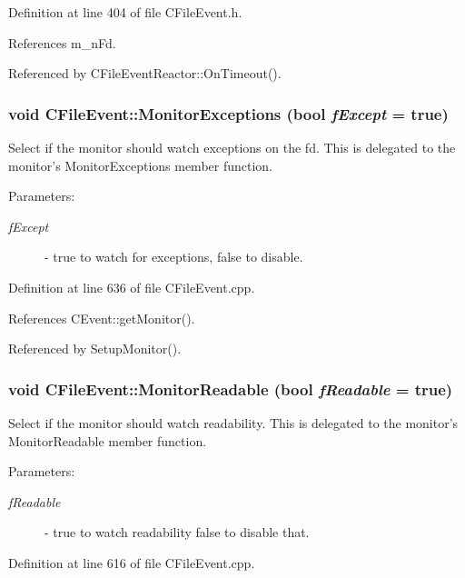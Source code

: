 Definition at line 404 of file CFile\-Event.h.

References m\_\-n\-Fd.

Referenced by CFile\-Event\-Reactor::On\-Timeout().
\subsubsection{\setlength{\rightskip}{0pt plus 5cm}void CFile\-Event::Monitor\-Exceptions (bool {\em f\-Except} = true)}\label{classCFileEvent_a14}


Select if the monitor should watch exceptions on the fd. This is delegated to the monitor's Monitor\-Exceptions member function. \begin{Desc}
\item[Parameters: ]\par
\begin{description}
\item[{\em 
f\-Except}]- true to watch for exceptions, false to disable. \end{description}
\end{Desc}


Definition at line 636 of file CFile\-Event.cpp.

References CEvent::get\-Monitor().

Referenced by Setup\-Monitor().
\subsubsection{\setlength{\rightskip}{0pt plus 5cm}void CFile\-Event::Monitor\-Readable (bool {\em f\-Readable} = true)}\label{classCFileEvent_a12}


Select if the monitor should watch readability. This is delegated to the monitor's Monitor\-Readable member function. \begin{Desc}
\item[Parameters: ]\par
\begin{description}
\item[{\em 
f\-Readable}]- true to watch readability false to disable that. \end{description}
\end{Desc}


Definition at line 616 of file CFile\-Event.cpp.


